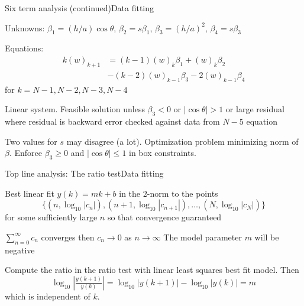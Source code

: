 \documentclass[11pt,svgnames,fleqn]{beamer}
\newcommand{\NC}[1]{{\color{red}#1}}
\newcommand{\DM}[1]{\begin{displaymath} {#1} \end{displaymath}}
\newcommand{\parbg}[1]{\left(  {#1} \right)}
\newcommand{\Setbg}[1]{\bigl\{ {#1} \bigr\}}
\newcommand{\tc}[2]{(#1)_{#2}}
\begin{document}
\begin{frame}{Six term analysis (continued)}{Data fitting}

 Unknowns:
  $\beta_1 = (h/a) \cos \theta$,
  $\beta_2 = s \beta_1$,
  $\beta_3 = (h/a)^2$,
  $\beta_4 = s \beta_3$

  \vspace{2mm}

  Equations:
  \begin{align*}
    k \tc{w}{k+1} & = \parbg{k-1} \tc{w}{k} \beta_1 +  \tc{w}{k} \beta_2 \\
                  & - \parbg{k-2} \tc{w}{k-1} \beta_3 - 2 \tc{w}{k-1} \beta_4
  \end{align*}
  for $k=N-1, N-2, N-3, N-4$

  \vspace{2mm}

  Linear system. Feasible solution unless $\beta_3 < 0$ or $|\cos \theta| > 1$ or
  large residual where residual is backward error checked against
  data from $N-5$ equation

  \vspace{2mm}

  Two values for $s$ may disagree (a lot).
  Optimization problem minimizing norm of $\beta$.
  Enforce $\beta_3 \geq 0$ and $|\cos \theta| \leq 1$ in box constraints.

\end{frame}

\begin{frame}{Top line analysis: The ratio test}{Data fitting}

Best linear fit $y(k) = m k + b$ in the $2$-norm to the points
\DM
{
  \Setbg{(n, \log_{10} | c_{n} |), (n+1, \log_{10} |c_{n+1}|), \ldots, (N, \log_{10} |c_{N}|)}
}
for some sufficiently large $n$ so that convergence guaranteed
\vspace{4mm}

$\sum_{n=0}^{\infty} c_n$ converges then $c_n \rightarrow 0$ as $n \rightarrow \infty$
\NC{The model parameter $m$ will be negative}

\vspace{4mm}

Compute the ratio in the ratio test with linear least squares best fit model. Then
\DM
{
  \log_{10} \left| \tfrac{y(k+1)}{y(k)} \right| = \log_{10} | y(k+1) | - \log_{10} | y(k) | = m
}
which is independent of $k$.

\end{frame}
\end{document}
